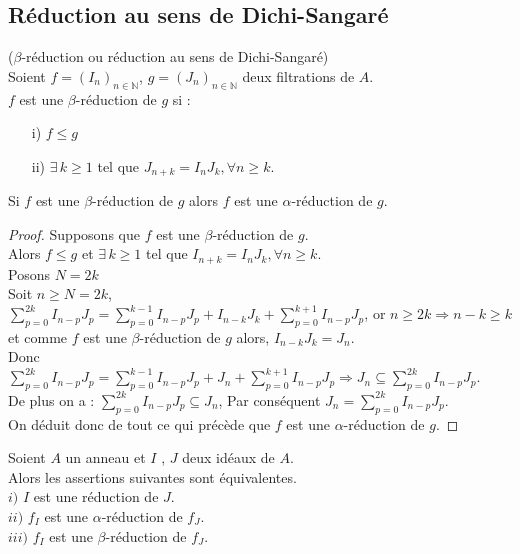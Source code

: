\subsection{Réduction au sens de Dichi-Sangaré}
\begin{madefinition}
	($\beta$-réduction ou réduction au sens de Dichi-Sangaré)\\
	Soient $f = (I_n)_{n \in \mathbb{N}}$, $g = (J_n)_{n \in \mathbb{N}}$ deux filtrations de $A$.\\
	$f$ est une $\beta$-réduction de $g$ si : \\
	\begin{enumerate}
		\item[i)] $f \leq g$
		\item[ii)]  $\exists \, k \geq 1$ tel que $J_{n+k} = I_n J_k , \forall n \geq k$.
	\end{enumerate}
\end{madefinition}
\begin{maremarque}
	Si $f$ est une $\beta$-réduction de $g$ alors $f$ est une $\alpha$-réduction de $g$.\\	
\end{maremarque}
\begin{proof}
	Supposons que $f$ est une $\beta$-réduction de $g$.\\
	Alors $f \leq g$ et $\exists \, k \geq 1$ tel que $I_{n+k} = I_n J_k , \forall n \geq k$.\\
	Posons $N = 2k$\\
	Soit $n \geq N= 2k$,\\
	$\displaystyle \sum_{p=0}^{2k}{I_{n-p} J_{p}} = \displaystyle \sum_{p=0}^{k-1}{I_{n-p} J_{p}} + I_{n-k} J_k + \displaystyle \sum_{p=0}^{k+1}{I_{n-p} J_{p}}$, or $n \geq  2k \Rightarrow n-k \geq k$ et comme $f$ est une $\beta$-réduction de $g$ alors, $I_{n-k} J_k = J_n$.\\
	Donc $\displaystyle \sum_{p=0}^{2k}{I_{n-p} J_{p}} = \displaystyle \sum_{p=0}^{k-1}{I_{n-p} J_{p}} + J_n + \displaystyle \sum_{p=0}^{k+1}{I_{n-p} J_{p}} \Rightarrow J_n \subseteq \displaystyle \sum_{p=0}^{2k}{I_{n-p} J_{p}}$.\\
	De plus on a : $\displaystyle \sum_{p=0}^{2k}{I_{n-p} J_{p}} \subseteq J_n$, 
	Par conséquent $J_n = \displaystyle \sum_{p=0}^{2k}{I_{n-p} J_{p}}$.\\
	On déduit donc de tout ce qui précède que $f$ est une $\alpha$-réduction de $g$.
\end{proof}
\begin{maproposition}
	Soient $A$ un anneau et $I$ , $J$ deux idéaux de $A$.\\
	Alors les assertions suivantes sont équivalentes.\\
	$i)$ $I$ est une réduction de $J$.\\
	$ii)$ $f_I$ est une $\alpha$-réduction de $f_J$.\\
	$iii)$ $f_I$ est une $\beta$-réduction de $f_J$.
\end{maproposition}
